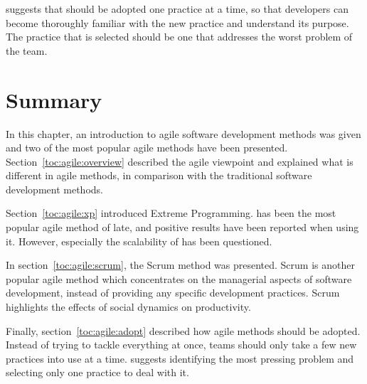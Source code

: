 \cite{xpexplained} suggests that  should be adopted one 
practice at a time, so that developers can become thoroughly familiar 
with the new practice and understand its purpose. The practice that is 
selected should be one that addresses the worst problem of the team.


\section{Summary}
\label{toc:agile:summary}

In this chapter, an introduction to agile software development methods 
was given and two of the most popular agile methods have been 
presented. Section~\ref{toc:agile:overview} described the agile 
viewpoint and explained what is different in agile methods, in 
comparison with the traditional software development methods.

Section~\ref{toc:agile:xp} introduced Extreme Programming.  
has been the most popular agile method of late, and positive results 
have been reported when using it. However, especially the scalability 
of  has been questioned.

In section~\ref{toc:agile:scrum}, the Scrum method was presented. 
Scrum is another popular agile method which concentrates on the 
managerial aspects of software development, instead of providing any 
specific development practices. Scrum highlights the effects of social 
dynamics on productivity.

Finally, section~\ref{toc:agile:adopt} described how agile methods 
should be adopted. Instead of trying to tackle everything at once, 
teams should only take a few new practices into use at a time. 
\cite{xpexplained} suggests identifying the most pressing problem and 
selecting only one  practice to deal with it.

